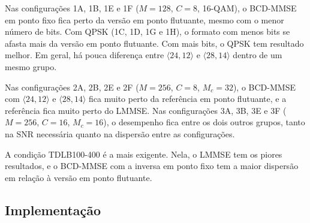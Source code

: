 Nas configurações 1A, 1B, 1E e 1F ($M = 128$, $C = 8$, 16-QAM), o BCD-MMSE em ponto fixo fica perto da versão em ponto flutuante, mesmo com o menor número de bits. Com QPSK (1C, 1D, 1G e 1H), o formato com menos bits se afasta mais da versão em ponto flutuante. Com mais bits, o QPSK tem resultado melhor. Em geral, há pouca diferença entre $\langle 24,12\rangle$ e $\langle 28,14\rangle$ dentro de um mesmo grupo.

Nas configurações 2A, 2B, 2E e 2F ($M = 256$, $C = 8$, $M_c = 32$), o BCD-MMSE com $\langle 24,12\rangle$ e $\langle 28,14\rangle$ fica muito perto da referência em ponto flutuante, e a referência fica muito perto do LMMSE. Nas configurações 3A, 3B, 3E e 3F ($M = 256$, $C = 16$, $M_c = 16$), o desempenho fica entre os dois outros grupos, tanto na SNR necessária quanto na dispersão entre as configurações.

A condição TDLB100-400 é a mais exigente. Nela, o LMMSE tem os piores resultados, e o BCD-MMSE com a inversa em ponto fixo tem a maior dispersão em relação à versão em ponto flutuante.

\subsection{Implementação}




